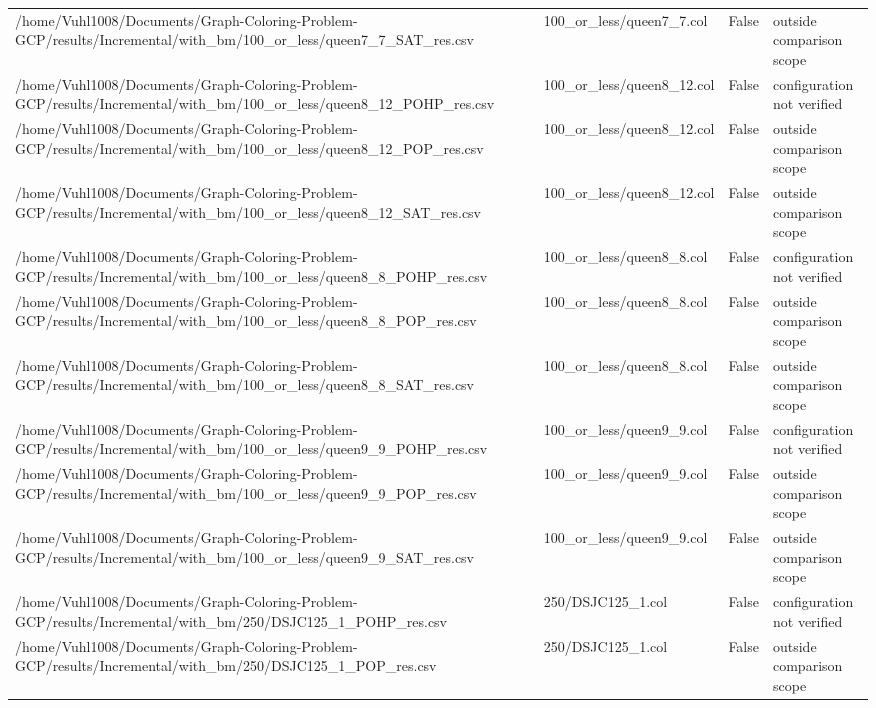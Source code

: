 \begin{table}[htbp]
\begin{tabular}{llll}
/home/Vuhl1008/Documents/Graph-Coloring-Problem-GCP/results/Incremental/with\_bm/100\_or\_less/queen7\_7\_SAT\_res.csv & 100\_or\_less/queen7\_7.col & False & outside comparison scope \\
/home/Vuhl1008/Documents/Graph-Coloring-Problem-GCP/results/Incremental/with\_bm/100\_or\_less/queen8\_12\_POHP\_res.csv & 100\_or\_less/queen8\_12.col & False & configuration not verified \\
/home/Vuhl1008/Documents/Graph-Coloring-Problem-GCP/results/Incremental/with\_bm/100\_or\_less/queen8\_12\_POP\_res.csv & 100\_or\_less/queen8\_12.col & False & outside comparison scope \\
/home/Vuhl1008/Documents/Graph-Coloring-Problem-GCP/results/Incremental/with\_bm/100\_or\_less/queen8\_12\_SAT\_res.csv & 100\_or\_less/queen8\_12.col & False & outside comparison scope \\
/home/Vuhl1008/Documents/Graph-Coloring-Problem-GCP/results/Incremental/with\_bm/100\_or\_less/queen8\_8\_POHP\_res.csv & 100\_or\_less/queen8\_8.col & False & configuration not verified \\
/home/Vuhl1008/Documents/Graph-Coloring-Problem-GCP/results/Incremental/with\_bm/100\_or\_less/queen8\_8\_POP\_res.csv & 100\_or\_less/queen8\_8.col & False & outside comparison scope \\
/home/Vuhl1008/Documents/Graph-Coloring-Problem-GCP/results/Incremental/with\_bm/100\_or\_less/queen8\_8\_SAT\_res.csv & 100\_or\_less/queen8\_8.col & False & outside comparison scope \\
/home/Vuhl1008/Documents/Graph-Coloring-Problem-GCP/results/Incremental/with\_bm/100\_or\_less/queen9\_9\_POHP\_res.csv & 100\_or\_less/queen9\_9.col & False & configuration not verified \\
/home/Vuhl1008/Documents/Graph-Coloring-Problem-GCP/results/Incremental/with\_bm/100\_or\_less/queen9\_9\_POP\_res.csv & 100\_or\_less/queen9\_9.col & False & outside comparison scope \\
/home/Vuhl1008/Documents/Graph-Coloring-Problem-GCP/results/Incremental/with\_bm/100\_or\_less/queen9\_9\_SAT\_res.csv & 100\_or\_less/queen9\_9.col & False & outside comparison scope \\
/home/Vuhl1008/Documents/Graph-Coloring-Problem-GCP/results/Incremental/with\_bm/250/DSJC125\_1\_POHP\_res.csv & 250/DSJC125\_1.col & False & configuration not verified \\
/home/Vuhl1008/Documents/Graph-Coloring-Problem-GCP/results/Incremental/with\_bm/250/DSJC125\_1\_POP\_res.csv & 250/DSJC125\_1.col & False & outside comparison scope \\

\end{tabular}
\end{table}
